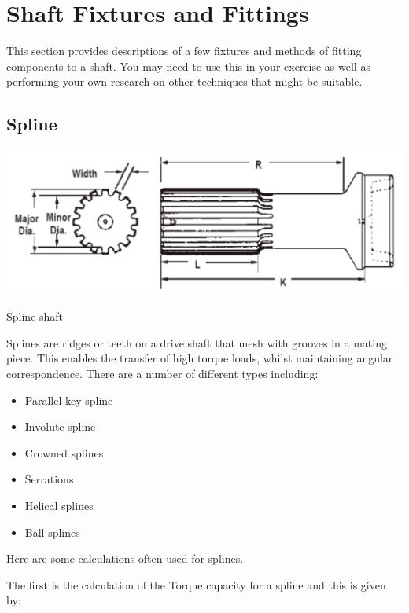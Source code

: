 
\section{Shaft Fixtures and Fittings}

This section provides descriptions of a few fixtures and methods of fitting components to a shaft. You may need to use this in your exercise as well as performing your own research on other techniques that might be suitable.

\subsection{Spline}

\begin{marginfigure}
    \centering
    \includegraphics[width=\textwidth]{09_fixtures_and_fittings/spline-shaft.png}
    \caption{Spline shaft}
\end{marginfigure}
Splines are ridges or teeth on a drive shaft that mesh with grooves in a mating piece. This enables the transfer of high torque loads, whilst maintaining angular correspondence. There are a number of different types including:

\begin{itemize}
    \item Parallel key spline
    \item Involute spline
    \item Crowned splines
    \item Serrations
    \item Helical splines
    \item Ball splines
\end{itemize}

Here are some calculations often used for splines.

The first is the calculation of the Torque capacity for a spline and this is given by:

